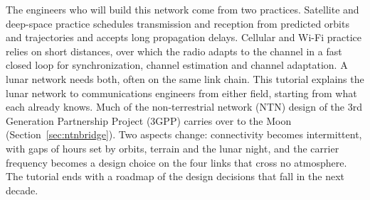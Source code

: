\documentclass{IEEEoj}
\begin{document}
The engineers who will build this network come from two practices. Satellite and deep-space practice schedules transmission and reception from predicted orbits and trajectories and accepts long propagation delays. Cellular and Wi-Fi practice relies on short distances, over which the radio adapts to the channel in a fast closed loop for synchronization, channel estimation and channel adaptation. A lunar network needs both, often on the same link chain. This tutorial explains the lunar network to communications engineers from either field, starting from what each already knows. Much of the non-terrestrial network (NTN) design of the 3rd Generation Partnership Project (3GPP) carries over to the Moon (Section~\ref{sec:ntnbridge}). Two aspects change: connectivity becomes intermittent, with gaps of hours set by orbits, terrain and the lunar night, and the carrier frequency becomes a design choice on the four links that cross no atmosphere. The tutorial ends with a roadmap of the design decisions that fall in the next decade.
%
\end{document}
